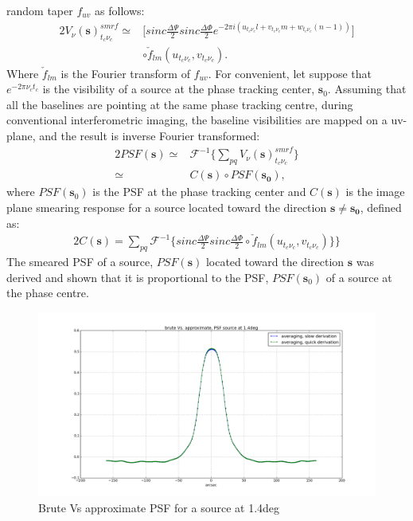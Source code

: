 random taper $f_{uv}$ as follows:
\begin{alignat}{2}
V_{\nu}(\mathbf{s})^{smrf}_{t_c \nu_c} \simeq &  \big[sinc\frac{\Delta \Psi}{2}sinc\frac{\Delta \Phi}{2}e^{-2\pi i (u_{t_c\nu_c}l+v_{t_c\nu_c}m+w_{t_c\nu_c}(n-1))}
\big]\\
&\circ \check{f}_{lm}(u_{t_c\nu_c},v_{t_c\nu_c})\label{eq:5}.
\end{alignat}
Where $\check{f}_{lm}$ is the Fourier transform of $f_{uv}$.
For convenient, let suppose that $e^{−2\pi\nu_ct_c}$ is the visibility of a source at the phase tracking center, $\mathbf{s}_0$. Assuming
that all the baselines are pointing at the same phase tracking centre, during conventional interferometric imaging,
the baseline visibilities are mapped on a uv-plane, and the result is inverse Fourier transformed:
\begin{alignat}{2}
PSF(\mathbf{s}) \simeq & \mathcal{F}^{-1}\Big\{\sum_{pq}V_{\nu}(\mathbf{s})^{smrf}_{t_c \nu_c}\big\}\\
		\simeq & C(\mathbf{s})\circ PSF(\mathbf{s_0}),
\end{alignat}
where $PSF(\mathbf{s}_0)$ is the PSF at the phase tracking center
and $C(\mathbf{s})$ is the image plane smearing response for a source
located toward the direction $\mathbf{s}\neq \mathbf{s_0}$, defined as:
\begin{alignat}{2}
C(\mathbf{s}) = \sum_{pq}\mathcal{F}^{-1}\Big\{sinc\frac{\Delta \Psi}{2}sinc\frac{\Delta \Phi}{2}\circ \check{f}_{lm}(u_{t_c\nu_c},v_{t_c\nu_c})\}\Big\}
\end{alignat}
The smeared PSF of a source, $PSF(\mathbf{s})$ located toward the
direction $\mathbf{s}$ was derived and shown that it is proportional
to the PSF, $PSF(\mathbf{s}_0)$ of a source at the phase centre.
\begin{figure}
\includegraphics[width=1\textwidth]{./Figures/averaging_brute_quick_good.png}\caption{Brute Vs approximate PSF for a source at 1.4deg}\label{fig:uvcov}
 \end{figure}
